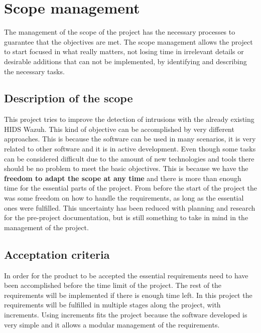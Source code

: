 \section{Scope management}
The management of the scope of the project has the necessary processes to guarantee that the objectives are met.
The scope management allows the project to start focused in what really matters, not losing time in irrelevant details or desirable additions that can not be implemented, by identifying and describing the necessary tasks.

\subsection{Description of the scope}
This project tries to improve the detection of intrusions with the already existing HIDS Wazuh. This kind of objective can be accomplished by very different approaches. This is because the software can be used in many scenarios, it is very related to other software and it is in active development.
\linej
Even though some tasks can be considered difficult due to the amount of new technologies and tools there should be no problem to meet the basic objectives.
This is because we have the \textbf{freedom to adapt the scope at any time} and there is more than enough time for the essential parts of the project.
\linej
\linej
From before the start of the project the was some freedom on how to handle the requirements, as long as the essential ones were fulfilled. This uncertainty has been reduced with planning and research for the pre-project documentation, but is still something to take in mind in the management of the project.

\subsection{Acceptation criteria}
In order for the product to be accepted the essential requirements need to have been accomplished before the time limit of the project.
The rest of the requirements will be implemented if there is enough time left.
\linej
In this project the requirements will be fulfilled in multiple stages along the project, with increments.
Using increments fits the project because the software developed is very simple and it allows a modular management of the requirements.

